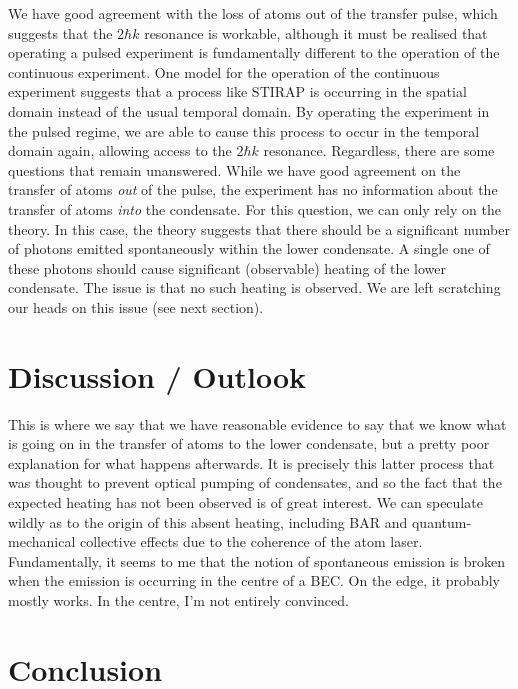 We have good agreement with the loss of atoms out of the transfer pulse, which suggests that the $2 \hbar k$ resonance is workable, although it must be realised that operating a pulsed experiment is fundamentally different to the operation of the continuous experiment.  One model for the operation of the continuous experiment suggests that a process like STIRAP is occurring in the spatial domain instead of the usual temporal domain.  By operating the experiment in the pulsed regime, we are able to cause this process to occur in the temporal domain again, allowing access to the $2 \hbar k$ resonance.  Regardless, there are some questions that remain unanswered.  While we have good agreement on the transfer of atoms \emph{out} of the pulse, the experiment has no information about the transfer of atoms \emph{into} the condensate.  For this question, we can only rely on the theory.  In this case, the theory suggests that there should be a significant number of photons emitted spontaneously within the lower condensate.  A single one of these photons should cause significant (observable) heating of the lower condensate.  The issue is that no such heating is observed.  We are left scratching our heads on this issue (see next section).

\section{Discussion / Outlook}

This is where we say that we have reasonable evidence to say that we know what is going on in the transfer of atoms to the lower condensate, but a pretty poor explanation for what happens afterwards.  It is precisely this latter process that was thought to prevent optical pumping of condensates, and so the fact that the expected heating has not been observed is of great interest.  We can speculate wildly as to the origin of this absent heating, including BAR and quantum-mechanical collective effects due to the coherence of the atom laser.  Fundamentally, it seems to me that the notion of spontaneous emission is broken when the emission is occurring in the centre of a BEC.  On the edge, it probably mostly works.  In the centre, I'm not entirely convinced.

\section{Conclusion}

